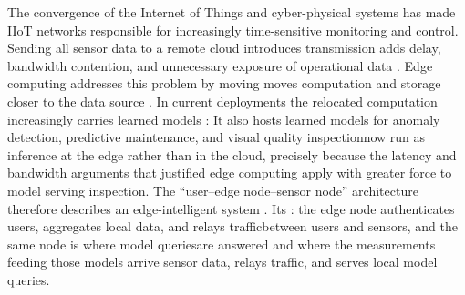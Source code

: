\documentclass[cmc,article,submit,moreauthors,pdftex]{Definitions/tsp}
\providecommand{\DIFadd}[1]{{\protect\color{blue} \sf #1}} %
\providecommand{\DIFdel}[1]{{\protect\color{red} \scriptsize #1}} %
\providecommand{\DIFaddbegin}{} %
\providecommand{\DIFaddend}{} %
\providecommand{\DIFdelbegin}{} %
\providecommand{\DIFdelend}{} %
\begin{document}
The convergence of the Internet of Things and cyber-physical systems has made IIoT networks responsible for \DIFdelbegin \DIFdel{increasingly }\DIFdelend time-sensitive monitoring and control. Sending all sensor data to a remote cloud \DIFdelbegin \DIFdel{introduces transmission }\DIFdelend \DIFaddbegin \DIFadd{adds }\DIFaddend delay, bandwidth contention, and \DIFdelbegin \DIFdel{unnecessary }\DIFdelend exposure of operational data \DIFdelbegin \DIFdel{\cite{ollschlaeger,shi,mao,qiu,mach}}\DIFdelend \DIFaddbegin \DIFadd{\cite{shi}}\DIFaddend . Edge computing \DIFdelbegin \DIFdel{addresses this problem by moving }\DIFdelend \DIFaddbegin \DIFadd{moves }\DIFaddend computation and storage closer to the \DIFdelbegin \DIFdel{data }\DIFdelend source \cite{ranaweera,srinivas}. \DIFdelbegin \DIFdel{In current deployments the relocated computation increasingly carries learned models : }\DIFdelend \DIFaddbegin \DIFadd{It also hosts learned models for }\DIFaddend anomaly detection, predictive maintenance, and visual \DIFdelbegin \DIFdel{quality inspectionnow run as inference at the edge rather than in the cloud, precisely because the latency and bandwidth arguments that justified edge computing apply with greater force to model serving}\DIFdelend \DIFaddbegin \DIFadd{inspection}\DIFaddend . The ``user--edge node--sensor node'' architecture therefore describes an edge-intelligent system\DIFdelbegin \DIFdel{. Its }\DIFdelend \DIFaddbegin \DIFadd{: the }\DIFaddend edge node authenticates users, aggregates \DIFdelbegin \DIFdel{local data, and relays trafficbetween users and sensors, and the same node is where model queriesare answered and where the measurements feeding those models arrive}\DIFdelend \DIFaddbegin \DIFadd{sensor data, relays traffic, and serves local model queries}\DIFaddend .
\end{document}
